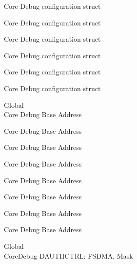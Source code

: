 \begin{DoxyRefList}
\label{deprecated__deprecated000230}%
%
Core Debug configuration struct 

\label{deprecated__deprecated000293}%
%
Core Debug configuration struct 

\label{deprecated__deprecated000372}%
%
Core Debug configuration struct 

\label{deprecated__deprecated000448}%
%
Core Debug configuration struct 

\label{deprecated__deprecated000551}%
%
Core Debug configuration struct 

\label{deprecated__deprecated000653}%
%
Core Debug configuration struct  
\item[Global \doxylink{group___c_m_s_i_s___core_debug_ga680604dbcda9e9b31a1639fcffe5230b}{Core\+Debug\+\_\+\+BASE} ]\hfill \\
\label{deprecated__deprecated000099}%
%
Core Debug Base Address 

\label{deprecated__deprecated000153}%
%
Core Debug Base Address 

\label{deprecated__deprecated000229}%
%
Core Debug Base Address 

\label{deprecated__deprecated000292}%
%
Core Debug Base Address 

\label{deprecated__deprecated000371}%
%
Core Debug Base Address 

\label{deprecated__deprecated000447}%
%
Core Debug Base Address 

\label{deprecated__deprecated000550}%
%
Core Debug Base Address 

\label{deprecated__deprecated000652}%
%
Core Debug Base Address  
\item[Global \doxylink{group___c_m_s_i_s___s_c_b_gab7f3f76af0236f8d3d3a090f50d4841a}{Core\+Debug\+\_\+\+DAUTHCTRL\+\_\+\+FSDMA\+\_\+\+Msk} ]\hfill \\
\label{deprecated__deprecated000084}%
%
Core\+Debug DAUTHCTRL\+: FSDMA, Mask 


\end{DoxyRefList}
